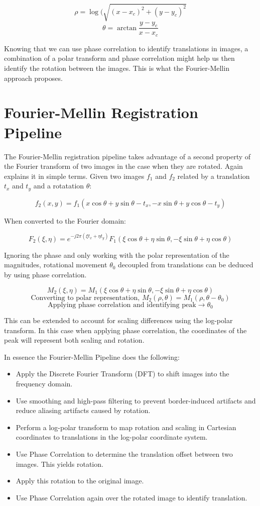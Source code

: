 \[\rho = \log(\sqrt{(x-x_c)^2 + (y - y_c)^2}\]
\[\theta = \arctan{\frac{y - y_c}{x-x_c}}\]

Knowing that we can use phase correlation to identify translations in images, a combination of a polar transform and phase correlation might help us then identify the rotation between the images. This is what the Fourier-Mellin approach proposes.

\section{Fourier-Mellin Registration Pipeline \cite{Reddy1996}}
\label{sec:fm-registration}

The Fourier-Mellin registration pipeline takes advantage of a second property of the Fourier transform of two images in the case when they are rotated. Again \citeauthor{Reddy1996} explains it in simple terms. Given two images \(f_1\) and \(f_2\) related by a translation \(t_x\) and \(t_y\) and a rotatation \(\theta\):

\[f_2(x,y)=f_1(x \cos{\theta} + y \sin{\theta} -t_x, - x \sin{\theta} + y \cos{\theta} - t_y)\]

When converted to the Fourier domain:

\[F_2(\xi,\eta)=e^{-j2\pi(\xi t_x + \eta t_y)} F_1(\xi\cos{\theta} + \eta\sin{\theta},-\xi\sin{\theta} + \eta\cos{\theta})\]

Ignoring the phase and only working with the polar representation of the magnitudes, rotational movement \(\theta_0\) decoupled from translations can be deduced by using phase correlation.

\[M_2(\xi,\eta)=M_1(\xi\cos{\theta} + \eta\sin{\theta},-\xi\sin{\theta} + \eta\cos{\theta})\]
\[\mbox{Converting to polar representation, }M_2(\rho,\theta)=M_1(\rho,\theta - \theta_0)\]
\[\mbox{Applying phase correlation and identifying peak} \rightarrow \theta_0\]

This can be extended to account for scaling differences using the log-polar transform. In this case when applying phase correlation, the coordinates of the peak will represent both scaling and rotation.

In essence the Fourier-Mellin Pipeline does the following:

\begin{itemize}
    \item Apply the Discrete Fourier Transform (DFT) to shift images into the frequency domain.
    \item Use smoothing and high-pass filtering to prevent border-induced artifacts and reduce aliasing artifacts caused by rotation.
    \item Perform a log-polar transform to map rotation and scaling in Cartesian coordinates to translations in the log-polar coordinate system.
    \item Use Phase Correlation to determine the translation offset between two images. This yields rotation.
    \item Apply this rotation to the original image.
    \item Use Phase Correlation again over the rotated image to identify translation.
\end{itemize}

